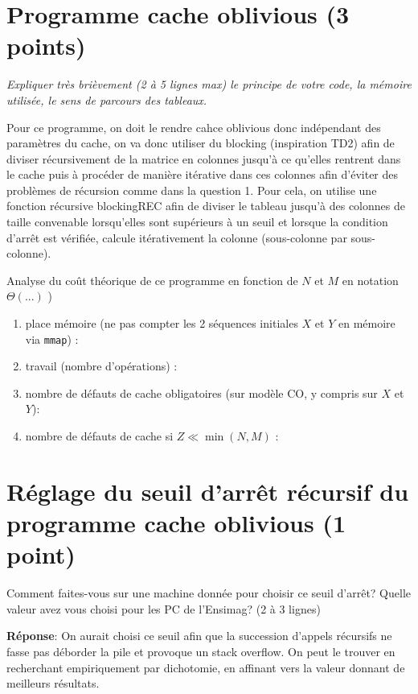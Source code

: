 \documentclass[10pt,a4paper]{article}
\begin{document}
\newpage

\section{Programme cache oblivious  (3 points)}
{\em Expliquer très brièvement (2 à 5 lignes max) le principe de votre code, la mémoire utilisée, le sens de parcours des tableaux.}
\vspace*{0.1cm}

Pour ce programme, on doit le rendre cahce oblivious donc indépendant des paramètres du cache, on va donc utiliser du blocking (inspiration TD2) afin de diviser récursivement de la matrice en colonnes jusqu'à ce qu'elles rentrent dans le cache puis à procéder de manière itérative dans ces colonnes afin d'éviter des problèmes de récursion comme dans la question 1.
Pour cela, on utilise une fonction récursive blockingREC afin de diviser le tableau jusqu'à des colonnes de taille convenable lorsqu'elles sont supérieurs à un seuil et lorsque la condition d'arrêt est vérifiée, calcule itérativement la colonne (sous-colonne par sous-colonne).
\vspace{1cm}

Analyse du coût théorique de ce  programme en fonction de $N$ et $M$  en notation $\Theta(...)$ )
\begin{enumerate}
  \item place mémoire (ne pas compter les 2 séquences initiales $X$ et $Y$ en mémoire via {\tt mmap}) : 
  \item travail (nombre d'opérations) : 
  \item nombre de défauts de cache obligatoires (sur modèle CO, y compris sur $X$ et $Y$):
  \item nombre de défauts de cache si $Z \ll \min(N,M)$ : 
\end{enumerate}

\section{Réglage du seuil d'arrêt récursif du programme cache oblivious  (1 point)} 
Comment faites-vous sur une machine donnée pour choisir ce seuil d'arrêt? Quelle valeur avez vous choisi pour les
PC de l'Ensimag? (2 à 3 lignes) 
\vspace{0.1cm}

\textbf{Réponse}: On aurait choisi ce seuil afin que la succession d'appels récursifs ne fasse pas déborder la pile et provoque un stack overflow.
On peut le trouver en recherchant empiriquement par dichotomie, en affinant vers la valeur donnant de meilleurs résultats.
\end{document}

